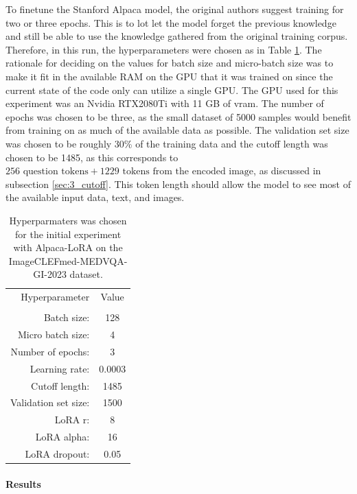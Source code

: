     To finetune the Stanford Alpaca model, the original authors suggest training for two or three epochs. This is to lot let the model forget the previous knowledge and still be able to use the knowledge gathered from the original training corpus. Therefore, in this run, the hyperparameters were chosen as in Table \ref{table:hyperparameters_5000}. The rationale for deciding on the values for batch size and micro-batch size was to make it fit in the available RAM on the GPU that it was trained on since the current state of the code only can utilize a single GPU. The GPU used for this experiment was an Nvidia RTX2080Ti with 11 GB of \gls{vram}. The number of epochs was chosen to be three, as the small dataset of 5000 samples would benefit from training on as much of the available data as possible. The validation set size was chosen to be roughly 30\% of the training data and the cutoff length was chosen to be 1485, as this corresponds to $256 \text{ question tokens} + 1229 \text{ tokens from the encoded image}$, as discussed in subsection \ref{sec:3_cutoff}. This token length should allow the model to see most of the available input data, text, and images.

    \begin{table}[htb]
    \centering
    \begin{tabular}{ r c } 
     
            Hyperparameter & Value\\ [0.5ex] 
        \Xhline{1.2pt}\\ 
            Batch size: & 128 \\
            Micro batch size: & 4 \\
            Number of epochs: & 3 \\
            Learning rate: & 0.0003 \\
            Cutoff length: & 1485 \\
            Validation set size: & 1500 \\
            LoRA r: & 8 \\
            LoRA alpha: & 16 \\
            LoRA dropout: & 0.05 \\  [0.5ex]
        \hline
    \end{tabular}
    \caption{Hyperparmaters was chosen for the initial experiment with Alpaca-LoRA on the ImageCLEFmed-MEDVQA-GI-2023 dataset.}
    \label{table:hyperparameters_5000}
    \end{table}
    

    \paragraph{Results\\}


